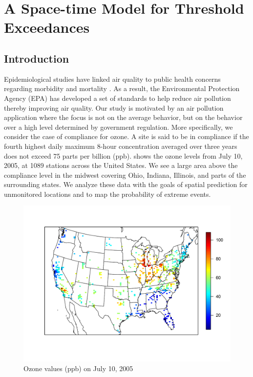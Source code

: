 \chapter{A Space-time \Skewt{} Model for Threshold Exceedances}
\label{chap:two}

\section{Introduction}\label{sts:intro}

Epidemiological studies have linked air quality to public health concerns regarding morbidity and mortality \citep{Samet2000}.
As a result, the Environmental Protection Agency (EPA) has developed a set of standards to help reduce air pollution thereby improving air quality.
Our study is motivated by an air pollution application where the focus is not on the average behavior, but on the behavior over a high level determined by government regulation.
More specifically, we consider the case of compliance for ozone.
A site is said to be in compliance if the fourth highest daily maximum 8-hour concentration averaged over three years does not exceed 75 parts per billion (ppb).
 shows the ozone levels from July 10, 2005, at 1089 stations across the United States.
We see a large area above the compliance level in the midwest covering Ohio, Indiana, Illinois, and parts of the surrounding states.
We analyze these data with the goals of spatial prediction for unmonitored locations and to map the probability of extreme events.

\begin{figure}[h!tbp]
  \centering
  \includegraphics[width=0.75\linewidth]{plots/ozone-10jul-us.pdf}
  \caption{Ozone values (ppb) on July 10, 2005}
  \label{stfig:ozone-10jul}
\end{figure}

